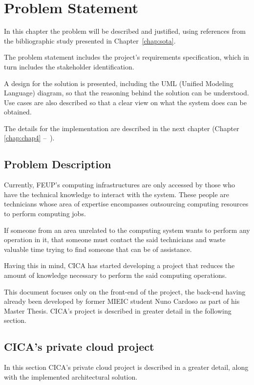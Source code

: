 \chapter{Problem Statement} \label{chap:chap3}

In this chapter the problem will be described and justified, using references from the bibliographic study presented in Chapter~\ref{chap:sota}.

The problem statement includes the project's requirements specification, which in turn includes the stakeholder identification. 

A design for the solution is presented, including the UML (Unified Modeling Language) diagram, so that the reasoning behind the solution can be understood. Use cases are also described so that a clear view on what the system does can be obtained. 

The details for the implementation are described in the next chapter (Chapter \ref{chap:chap4} --~).

\section{Problem Description}

Currently, FEUP's computing infrastructures are only accessed by those who have the technical knowledge to interact with the system. These people are technicians whose area of expertise encompasses outsourcing computing resources to perform computing jobs. 

If someone from an area unrelated to the computing system wants to perform any operation in it, that someone must contact the said technicians and waste valuable time trying to find someone that can be of assistance.

Having this in mind, CICA has started developing a project that reduces the amount of knowledge necessary to perform the said computing operations.

This document focuses only on the front-end of the project, the back-end having already been developed by former MIEIC student Nuno Cardoso as part of his Master Thesis. CICA's project is described in greater detail in the following section.

\section{CICA's private cloud project} \label{sec:project}

In this section CICA's private cloud project is described in a greater detail, along with the implemented architectural solution.

